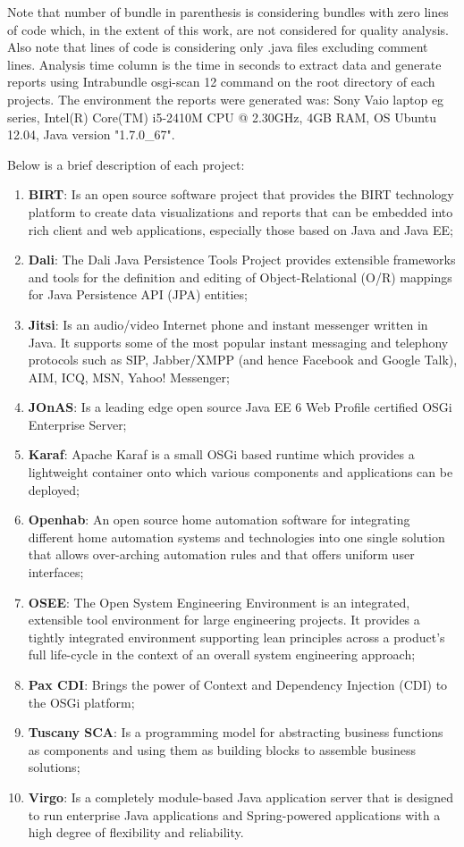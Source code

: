 Note that number of bundle in parenthesis is considering bundles with zero lines of code which, in the extent of this work, are not considered for quality analysis. Also note that lines of code is considering only .java files excluding comment lines.
Analysis time column is the time in seconds to extract data and generate reports using Intrabundle osgi-scan 12 command on the root directory of each projects. The environment the reports were generated was: Sony Vaio laptop eg series, Intel(R) Core(TM) i5-2410M CPU @ 2.30GHz, 4GB RAM, OS Ubuntu 12.04, Java version "1.7.0\_67".

Below is a brief description of each project:

\begin{enumerate}
\item \textbf{BIRT}: Is an open source software project that provides the BIRT technology platform to create data visualizations and reports that can be embedded into rich client and web applications, especially those based on Java and Java EE;
\item \textbf{Dali}: The Dali Java Persistence Tools Project provides extensible frameworks and tools for the definition and editing of Object-Relational (O/R) mappings for Java Persistence API (JPA) entities;
\item \textbf{Jitsi}: Is an audio/video Internet phone and instant messenger written in Java. It supports some of the most popular instant messaging and telephony protocols such as SIP, Jabber/XMPP (and hence Facebook and Google Talk), AIM, ICQ, MSN, Yahoo! Messenger;
\item \textbf{JOnAS}: Is a leading edge open source Java EE 6 Web Profile certified OSGi Enterprise Server;
\item \textbf{Karaf}: Apache Karaf is a small OSGi based runtime which provides a lightweight container onto which various components and applications can be deployed;
\item \textbf{Openhab}: An open source home automation software for integrating different home automation systems and technologies into one single solution that allows over-arching automation rules and that offers uniform user interfaces;
\item \textbf{OSEE}: The Open System Engineering Environment is an integrated, extensible tool environment for large engineering projects. It provides a tightly integrated environment supporting lean principles across a product's full life-cycle in the context of an overall system engineering approach;
\item \textbf{Pax CDI}: Brings the power of Context and Dependency Injection (CDI) to the OSGi platform; 
\item \textbf{Tuscany SCA}: Is a programming model for abstracting business functions as components and using them as building blocks to assemble business solutions; 
\item \textbf{Virgo}: Is a completely module-based Java application server that is designed to run enterprise Java applications and Spring-powered applications with a high degree of flexibility and reliability.
\end{enumerate}


